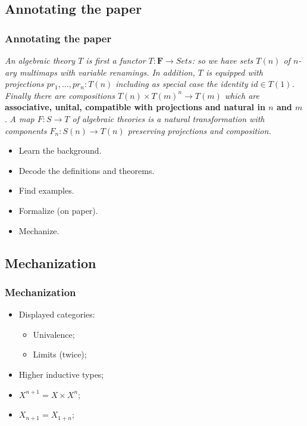 \documentclass[aspectratio=169]{fancyslides} %
\begin{document}
  \subsection{Annotating the paper}
  \begin{frame}
    \frametitle{Annotating the paper}

    \textit{An algebraic theory $ T $ is first a functor $ T : \mathbf{F} \to Sets $: so we have sets $ T(n) $ of $ n $-ary multimaps with variable renamings. In addition, $ T $ is equipped with projections $ pr_1, \dots, pr_n : T(n) $ including as special case the identity $ id \in T(1) $. Finally there are compositions $ T(n) \times T(m)^n \to T(m) $ which are} \textbf{associative, unital, compatible with projections and natural in $ n $ and $ m $}. \textit{A map $ F : S \to T $ of algebraic theories is a natural transformation with components $ F_n : S(n) \to T(n) $ preserving projections and composition.}

    \pause

    \begin{itemize}
      \item Learn the background.
      \item Decode the definitions and theorems.
      \item Find examples.
      \item Formalize (on paper).
      \item Mechanize.
    \end{itemize}

  \end{frame}

  \subsection{Mechanization}
  \begin{frame}
    \frametitle{Mechanization}

    \begin{itemize}
      \item Displayed categories:
      \begin{itemize}
        \item Univalence;
        \item Limits (twice);
      \end{itemize}
      \item Higher inductive types;
      \item $ X^{n + 1} = X \times X^n $;
      \item $ X_{n + 1} = X_{1 + n} $;
    \end{itemize}

  \end{frame}
\end{document}
